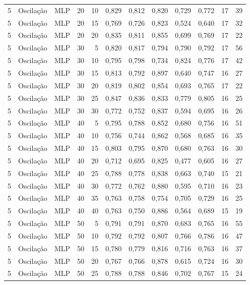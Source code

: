 \begin{longtable}{@{}rllrrrrrrrrr@{}}
5 & Oscilação & MLP & 20 & 10 & 0,829 & 0,812 & 0,820 & 0,729 & 0,772 & 17 & 39 \\
5 & Oscilação & MLP & 20 & 15 & 0,769 & 0,726 & 0,823 & 0,524 & 0,640 & 17 & 32 \\
5 & Oscilação & MLP & 20 & 20 & 0,835 & 0,811 & 0,855 & 0,699 & 0,769 & 17 & 22 \\
5 & Oscilação & MLP & 30 & 5 & 0,820 & 0,817 & 0,794 & 0,790 & 0,792 & 17 & 56 \\
5 & Oscilação & MLP & 30 & 10 & 0,795 & 0,798 & 0,734 & 0,824 & 0,776 & 17 & 42 \\
5 & Oscilação & MLP & 30 & 15 & 0,813 & 0,792 & 0,897 & 0,640 & 0,747 & 16 & 27 \\
5 & Oscilação & MLP & 30 & 20 & 0,819 & 0,802 & 0,854 & 0,693 & 0,765 & 17 & 22 \\
5 & Oscilação & MLP & 30 & 25 & 0,847 & 0,836 & 0,833 & 0,779 & 0,805 & 16 & 25 \\
5 & Oscilação & MLP & 30 & 30 & 0,772 & 0,752 & 0,837 & 0,594 & 0,695 & 16 & 26 \\
5 & Oscilação & MLP & 40 & 5 & 0,795 & 0,788 & 0,852 & 0,680 & 0,756 & 16 & 51 \\
5 & Oscilação & MLP & 40 & 10 & 0,756 & 0,744 & 0,862 & 0,568 & 0,685 & 16 & 35 \\
5 & Oscilação & MLP & 40 & 15 & 0,803 & 0,795 & 0,870 & 0,680 & 0,763 & 16 & 30 \\
5 & Oscilação & MLP & 40 & 20 & 0,712 & 0,695 & 0,825 & 0,477 & 0,605 & 16 & 27 \\
5 & Oscilação & MLP & 40 & 25 & 0,788 & 0,778 & 0,838 & 0,663 & 0,740 & 15 & 21 \\
5 & Oscilação & MLP & 40 & 30 & 0,772 & 0,762 & 0,880 & 0,595 & 0,710 & 16 & 23 \\
5 & Oscilação & MLP & 40 & 35 & 0,763 & 0,758 & 0,754 & 0,705 & 0,729 & 16 & 25 \\
5 & Oscilação & MLP & 40 & 40 & 0,763 & 0,750 & 0,886 & 0,564 & 0,689 & 15 & 19 \\
5 & Oscilação & MLP & 50 & 5 & 0,791 & 0,791 & 0,870 & 0,683 & 0,765 & 16 & 55 \\
5 & Oscilação & MLP & 50 & 10 & 0,792 & 0,792 & 0,807 & 0,766 & 0,786 & 16 & 47 \\
5 & Oscilação & MLP & 50 & 15 & 0,780 & 0,779 & 0,816 & 0,716 & 0,763 & 16 & 37 \\
5 & Oscilação & MLP & 50 & 20 & 0,767 & 0,766 & 0,878 & 0,615 & 0,724 & 16 & 30 \\
5 & Oscilação & MLP & 50 & 25 & 0,788 & 0,788 & 0,846 & 0,702 & 0,767 & 15 & 24 \\

\end{longtable}
